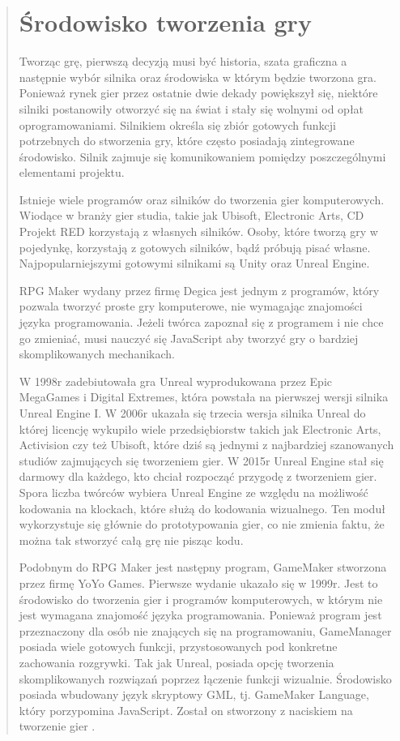 \begin{quotation}
\section{Środowisko tworzenia gry}

\indent Tworząc grę, pierwszą decyzją musi być historia, szata graficzna a następnie wybór silnika oraz środowiska w którym będzie tworzona gra. Ponieważ rynek gier przez ostatnie dwie dekady powiększył się, niektóre silniki postanowiły otworzyć się na świat i stały się wolnymi od opłat oprogramowaniami. Silnikiem określa się zbiór gotowych funkcji potrzebnych do stworzenia gry, które często posiadają zintegrowane środowisko. Silnik zajmuje się komunikowaniem pomiędzy poszczególnymi elementami projektu.

\indent Istnieje wiele programów oraz silników do tworzenia gier komputerowych. Wiodące w branży gier studia, takie jak Ubisoft, Electronic Arts, CD Projekt RED korzystają z własnych silników. Osoby, które tworzą gry w pojedynkę, korzystają z gotowych silników, bądź próbują pisać własne. Najpopularniejszymi gotowymi silnikami są Unity oraz Unreal Engine.

\indent RPG Maker wydany przez firmę Degica jest jednym z programów, który pozwala tworzyć proste gry komputerowe, nie wymagając znajomości języka programowania. Jeżeli twórca zapoznał się z programem i nie chce go zmieniać, musi nauczyć się JavaScript aby tworzyć gry o bardziej skomplikowanych mechanikach.

\indent W 1998r zadebiutowała gra Unreal wyprodukowana przez Epic MegaGames i Digital Extremes, która powstała na pierwszej wersji silnika Unreal Engine I. W 2006r ukazała się trzecia wersja silnika Unreal do której licencję wykupiło wiele przedsiębiorstw takich jak Electronic Arts, Activision czy też Ubisoft, które dziś są jednymi z najbardziej szanowanych studiów zajmujących się tworzeniem gier. W 2015r Unreal Engine stał się darmowy dla każdego, kto chciał rozpocząć przygodę z tworzeniem gier. Spora liczba twórców wybiera Unreal Engine ze względu na możliwość kodowania na klockach, które służą do kodowania wizualnego. Ten moduł wykorzystuje się głównie do prototypowania gier, co nie zmienia faktu, że można tak stworzyć całą grę nie pisząc kodu.

\indent Podobnym do RPG Maker jest następny program, GameMaker stworzona przez firmę YoYo Games. Pierwsze wydanie ukazało się w 1999r. Jest to środowisko do tworzenia gier i programów komputerowych, w którym nie jest wymagana znajomość języka programowania. Ponieważ program jest przeznaczony dla osób nie znających się na programowaniu, GameManager posiada wiele gotowych funkcji, przystosowanych pod konkretne zachowania rozgrywki.  Tak jak Unreal, posiada opcję tworzenia skomplikowanych rozwiązań poprzez łączenie funkcji wizualnie. Środowisko posiada wbudowany język skryptowy GML, tj. GameMaker Language, który porzypomina JavaScript. Został on stworzony z naciskiem na tworzenie gier \cite{2}.


\end{quotation}
